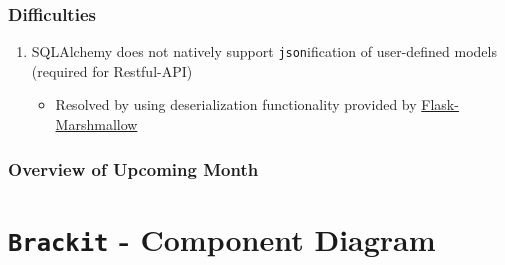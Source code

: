 \documentclass{article}
\begin{document}
\subsubsection*{Difficulties}
\begin{enumerate}
    \item{SQLAlchemy does not natively support \texttt{json}ification of user-defined models (required for Restful-API)
    \begin{itemize}
        \item{Resolved by using deserialization functionality provided by \href{https://flask-marshmallow.readthedocs.io/en/latest/}{Flask-Marshmallow}}
        
    \end{itemize}
    }
    
\end{enumerate}
\subsubsection*{Overview of Upcoming Month}

\clearpage
\section{\texttt{Brackit} - Component Diagram}
\end{document}
